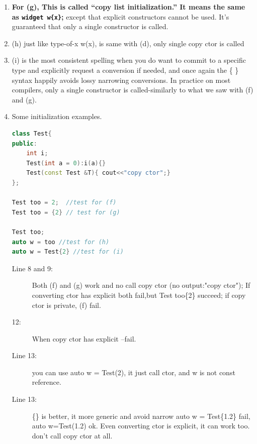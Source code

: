 \documentclass[a4paper,11pt,twoside]{book}
\begin{document}
\begin{itemize}
\begin{enumerate}
		\item \textbf{For (g), This is called “copy list initialization.” It means the same as \texttt{widget w\{x\}};} except that explicit constructors cannot be used. It’s guaranteed that only a single constructor is called.
		
		\item (h) just like type-of-x w(x), is same with (d), only single copy ctor is called
		
		\item (i) is the most consistent spelling when you do want to commit to a specific type and explicitly request a conversion if needed, and once again the \{ \} syntax happily avoids lossy narrowing conversions. In practice on most compilers, only a single constructor is called-similarly to what we saw with (f) and (g).
		
		\item Some initialization examples.
		
\begin{lstlisting}[frame=single, language=c++,mathescape=true]
class Test{
public:
	int i;
	Test(int a = 0):i(a){}
	Test(const Test &T){ cout<<"copy ctor";} 
};
		
Test too = 2;  //test for (f) 
Test too = {2} // test for (g)
		
Test too;  
auto w = too //test for (h)
auto w = Test{2} //test for (i)
\end{lstlisting}
\begin{description}
	\item[Line 8 and 9:] Both (f) and (g) work and no call copy ctor (no output:"copy ctor"); If converting ctor has explicit both fail,but Test too\{2\} succeed; if copy ctor is private, (f) fail.

	\item[12:] When copy ctor has explicit --fail.
	
	\item[Line 13:] you can use auto w = Test(2), it just call ctor, and w is not const reference.
	\item[Line 13:]  \{\} is better, it more generic and avoid narrow auto w = Test\{1.2\} fail, auto w=Test(1.2) ok. Even converting ctor is explicit, it can work too. don't call copy ctor at all.
\end{description}

	\end{enumerate}

\end{itemize}
\end{document}
